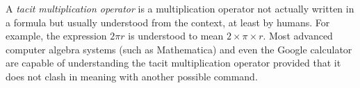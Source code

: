 \documentclass[12pt]{article}
\begin{document}
A {\em tacit multiplication operator} is a multiplication operator not actually written in a formula but usually understood from the context, at least by humans. For example, the expression $2\pi r$ is understood to mean $2 \times \pi \times r$. Most advanced computer algebra systems (such as Mathematica) and even the Google calculator are capable of understanding the tacit multiplication operator provided that it does not clash in meaning with another possible command.
\end{document}
